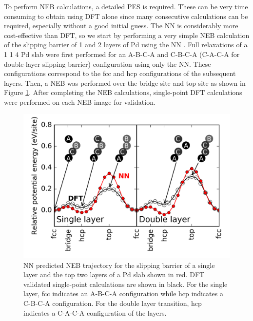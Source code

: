 \documentclass[12pt,oneside]{cmuthesis}
\begin{document}
To perform NEB calculations, a detailed PES is required. These can be very time consuming to obtain using DFT alone since many consecutive calculations can be required, especially without a good initial guess. The NN is considerably more cost-effective than DFT, so we start by performing a very simple NEB calculation of the slipping barrier of 1 and 2 layers of Pd using the NN \cite{boes-2016-neural-networ}. Full relaxations of a 1 \texttimes{} 1 \texttimes{} 4 Pd slab were first performed for an A-B-C-A and C-B-C-A (C-A-C-A for double-layer slipping barrier) configuration using only the NN. These configurations correspond to the fcc and hcp configurations of the subsequent layers. Then, a NEB was performed over the bridge site and top site as shown in Figure \ref{fig-Pd-slipping-NEB}. After completing the NEB calculations, single-point DFT calculations were performed on each NEB image for validation.

\begin{figure}[htbp]
\centering
\includegraphics[width=5.5in]{./images/Pd-slipping-NEB.png}
\caption{\label{fig-Pd-slipping-NEB}
NN predicted NEB trajectory for the slipping barrier of a single layer and the top two layers of a Pd slab shown in red. DFT validated single-point calculations are shown in black. For the single layer, fcc indicates an A-B-C-A configuration while hcp indicates a C-B-C-A configuration. For the double layer transition, hcp indicates a C-A-C-A configuration of the layers.}
\end{figure}
\end{document}
